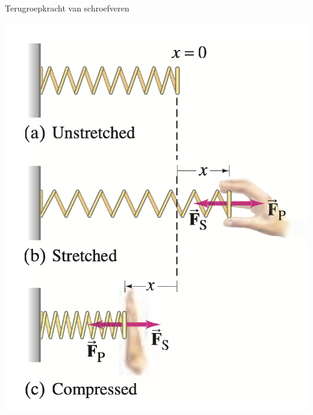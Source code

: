 \begin{app}{Terugroepkracht van schroefveren}
\begin{minipage}{.32\textwidth}
        \centering
        \includegraphics[scale = 0.325]{Images/Dynamica/Schroefveer.png}
        
    \end{minipage}
\end{app}


